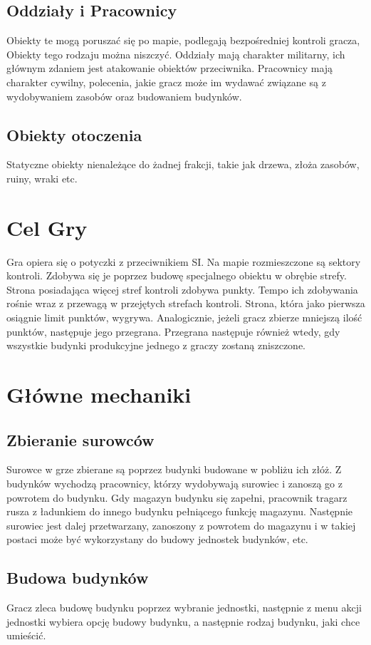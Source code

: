 \documentclass[a4paper]{scrreprt}
\begin{document}
\subsection{Oddziały i Pracownicy}
Obiekty te mogą poruszać się po mapie, podlegają bezpośredniej kontroli gracza, Obiekty tego rodzaju można niszczyć. Oddziały mają charakter militarny, ich głównym zdaniem jest atakowanie obiektów przeciwnika. Pracownicy mają charakter cywilny, polecenia, jakie gracz może im wydawać związane są z wydobywaniem zasobów oraz budowaniem budynków.
\subsection{Obiekty otoczenia}
Statyczne obiekty nienależące do żadnej frakcji, takie jak drzewa, złoża zasobów, ruiny, wraki etc. 

\section{Cel Gry}
Gra opiera się o potyczki z przeciwnikiem SI. Na mapie rozmieszczone są sektory kontroli. Zdobywa się je poprzez budowę specjalnego obiektu w obrębie strefy. Strona posiadająca więcej stref kontroli zdobywa punkty. Tempo ich zdobywania rośnie wraz z przewagą w przejętych strefach kontroli. Strona, która jako pierwsza osiągnie limit punktów, wygrywa. Analogicznie, jeżeli gracz zbierze mniejszą ilość punktów, następuje jego przegrana. Przegrana następuje również wtedy, gdy wszystkie budynki produkcyjne jednego z graczy zostaną zniszczone.
\section{Główne mechaniki}
\subsection{Zbieranie surowców}
Surowce w grze zbierane są poprzez budynki budowane w pobliżu ich złóż. Z budynków wychodzą pracownicy, którzy wydobywają surowiec i zanoszą go z powrotem do budynku. Gdy magazyn budynku się zapełni, pracownik  tragarz rusza z ładunkiem do innego budynku pełniącego funkcję magazynu. Następnie surowiec jest dalej przetwarzany, zanoszony z powrotem do magazynu i w takiej postaci może być wykorzystany do budowy jednostek budynków, etc.
\subsection{Budowa budynków} 
Gracz zleca budowę budynku poprzez wybranie jednostki, następnie z menu akcji jednostki wybiera opcję budowy budynku, a następnie rodzaj budynku, jaki chce umieścić. 
\end{document}
